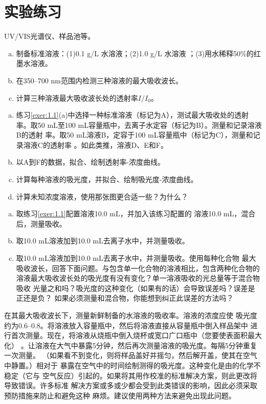 \section{实验练习}
\begin{exercise}\label{exer:1.1}
UV/VIS光谱仪、样品池等。
\begin{enumerate}[a.]
\item 制备标准溶液：(1)0.1 g/L 水溶液；(2)1.0 g/L 水溶液
    ；(3)用水稀释50\%的红墨水溶液。
\item 在350--700 nm范围内检测三种溶液的最大吸收波长。
\item 计算三种溶液最大吸收波长处的透射率$I/I_0$。
\end{enumerate}
\end{exercise}
\begin{exercise}
\begin{enumerate}[a.]
\item 练习\ref{exer:1.1}(a)中选择一种标准溶液（标记为A），测试最大吸收处的透射
    率。取50 mL至100 mL容量瓶中，去离子水定容（标记为B）。测量和记录溶液B的透射
    率。取50 mL溶液B，定容于100 mL容量瓶中（标记为C），测量和记录溶液C的透射率
    。如此类推，溶液D、E和F。
\item 以A到F的数据，拟合、绘制透射率-浓度曲线。
\item 计算每种溶液的吸光度，并拟合、绘制吸光度-浓度曲线。
\item 计算未知浓度溶液，使用那张图更合适一些？为什么？
\end{enumerate}
\end{exercise}
\begin{exercise}
\begin{enumerate}[a.]
\item 取练习\ref{exer:1.1}配置溶液10.0 mL，并加入该练习配置的
    溶液10.0 mL，混合后，测量吸收。
\item 取10.0 mL溶液加到10.0 mL去离子水中，并测量吸收。
\item 取10.0 mL溶液加到10.0 mL去离子水中，并测量吸收。使用每种化合物
    最大吸收波长，回答下面问题。与包含单一化合物的溶液相比，包含两种化合物的
    溶液最大吸收波长处的吸光度有没有变化？单一溶液吸收的光总量等于混合物吸收
    光量之和吗？吸光度的这种变化（如果有的话）会导致误差吗？误差是正还是负？
    如果必须测量和混合物，你能想到纠正此误差的方法吗？
\end{enumerate}
\end{exercise}
\begin{exercise}
在其最大吸收波长下，测量新鲜制备的水溶液的吸收率。溶液的浓度应使
吸光度约为0.6--0.8。将溶液放入容量瓶中，然后将溶液直接从容量瓶中倒入样品架中
进行首次测量。现在，将溶液从烧瓶中倒入烧杯或宽口广口瓶中（您要使表面积最大化）
。让溶液在大气中暴露5分钟，然后再次测量溶液的吸光度。每隔5分钟重复一次测量。
（如果看不到变化，则将样品盖好并摇匀，然后解开盖，使其在空气中静置。）相对于
暴露在空气中的时间绘制测得的吸光度。这种变化是由的化学不稳定（它与
空气反应）引起的。如果将其用作校准的标准解决方案，则此更改将导致错误。许多标准
解决方案或多或少都会受到此类错误的影响，因此必须采取预防措施来防止和避免这种
麻烦。建议使用两种方法来避免出现此问题。
\end{exercise}
